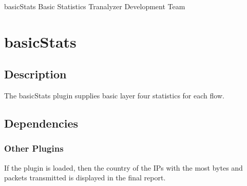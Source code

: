 \documentclass[documentation]{subfiles}
\begin{document}
\trantitle
    {basicStats}
    {Basic Statistics}
    {Tranalyzer Development Team} %

\section{basicStats}\label{s:basicStats}

\subsection{Description}
The basicStats plugin supplies basic layer four statistics for each flow.

\subsection{Dependencies}


\subsubsection{Other Plugins}
If the  plugin is loaded, then the country of the IPs with the most bytes and packets transmitted is displayed in the final report.

\end{document}
